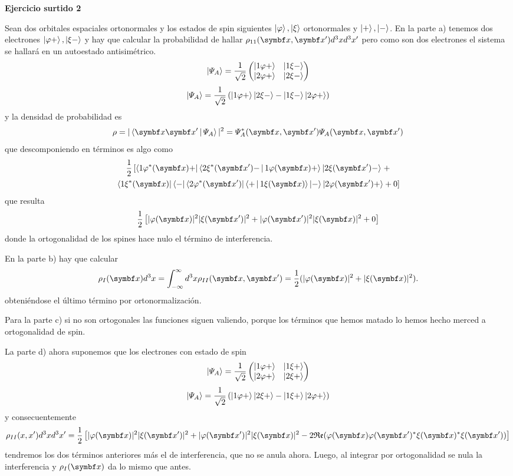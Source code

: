 \documentclass[10pt,oneside]{CBFT_book}
\begin{document}
\begin{ejemplo}{\bf Ejercicio surtido 2}

Sean dos orbitales espaciales ortonormales y los estados de spin siguientes
$\Ket{\varphi}, \Ket{\xi}$ ortonormales y $\Ket{+}, \Ket{-}$.
En la parte a) tenemos dos electrones $\Ket{\varphi +}, \Ket{\xi -}$ y hay que calcular la probabilidad de
hallar $\rho_{11}(\vbx,\vbx') d^3x d^3x'$ pero como son dos electrones el sistema se
hallará en un autoestado antisimétrico.
\[
	\Ket{\Psi_A} = \frac{1}{\sqrt{2}}
	\begin{pmatrix}
		\Ket{1 \varphi +} & \Ket{1 \xi -} \\
		\Ket{2 \varphi +} & \Ket{2 \xi -}
	\end{pmatrix}
\]
\[
	\Ket{\Psi_A} = \frac{1}{\sqrt{2}}
	\left(  \Ket{1 \varphi +} \Ket{2 \xi -} - \Ket{1 \xi -}\Ket{2 \varphi +}
	\right)
\]
y la densidad de probabilidad es
\[
	\rho = | \Braket{ \vbx \vbx' | \Psi_A } |^2 = \Psi^*_A(\vbx,\vbx') \Psi_A(\vbx,\vbx')
\]
que descomponiendo en términos es algo como
\begin{multline*}
 \frac{1}{2} \left[ \Bra{1 \vp^*(\vbx) + } \Braket{ 2 \xi^*(\vbx') - | 1 \vp(\vbx) + } 
 \Ket{ 2 \xi(\vbx') - }  \right. + \\
 \left. \Bra{1 \xi^*(\vbx)} \Bra{-} \Bra{2 \vp^*(\vbx')} \Braket{ + | 1 \xi(\vbx) } \Ket{-}
	\Ket{2 \vp(\vbx') + } + 0 \right]
\end{multline*}
que resulta
\[
	\frac{1}{2} \left[
	| \vp(\vbx) |^2 | \xi(\vbx') |^2 + | \vp(\vbx') |^2 | \xi(\vbx) |^2 + 0 
	\right] 
\]
donde la ortogonalidad de los spines hace nulo el término de interferencia.

En la parte b) hay que calcular
\[
	\rho_I(\vbx) d^3x = \int_{-\infty}^\infty d^3x \rho_{II}(\vbx,\vbx') =
	\frac{1}{2}( |\vp(\vbx)|^2 + |\xi(\vbx)|^2).
\]
obteniéndose el último término por ortonormalización.

Para la parte c) si no son ortogonales las funciones siguen valiendo, porque los términos que
hemos matado lo hemos hecho merced a ortogonalidad de spin.

La parte d) ahora suponemos que los electrones con estado de spin
\[
	\Ket{\Psi_A} = \frac{1}{\sqrt{2}}
	\begin{pmatrix}
		\Ket{1 \varphi +} & \Ket{1 \xi +} \\
		\Ket{2 \varphi +} & \Ket{2 \xi +}
	\end{pmatrix}
\]
\[
	\Ket{\Psi_A} = \frac{1}{\sqrt{2}}
	\left(  \Ket{1 \varphi +} \Ket{2 \xi +} - \Ket{1 \xi +}\Ket{2 \varphi +}
	\right)
\]
y consecuentemente
\[
	\rho_{II}(x,x')d^3xd^3x' = \frac{1}{2}
	\left[ 
	| \vp(\vbx) |^2 | \xi(\vbx') |^2 + | \vp(\vbx') |^2 | \xi(\vbx) |^2
	- 2 \mathfrak{Re}( \vp(\vbx)\vp(\vbx')^*\xi(\vbx)^*\xi(\vbx')  )
	\right]
\]
tendremos los dos términos anteriores más el de interferencia, que no se anula ahora.
Luego, al integrar por ortogonalidad se nula la interferencia y $\rho_I(\vbx)$ da lo
mismo que antes.

\end{ejemplo}





\end{document}
